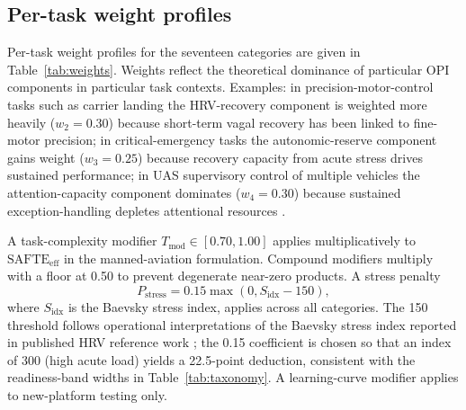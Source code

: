 \documentclass[10pt,journal,twocolumn,compsoc]{IEEEtran}
\begin{document}
\subsection{Per-task weight profiles}
Per-task weight profiles for the seventeen categories are given in Table~\ref{tab:weights}. Weights reflect the theoretical dominance of particular OPI components in particular task contexts. Examples: in precision-motor-control tasks such as carrier landing the HRV-recovery component is weighted more heavily ($w_2 = 0.30$) because short-term vagal recovery has been linked to fine-motor precision; in critical-emergency tasks the autonomic-reserve component gains weight ($w_3 = 0.25$) because recovery capacity from acute stress drives sustained performance; in UAS supervisory control of multiple vehicles the attention-capacity component dominates ($w_4 = 0.30$) because sustained exception-handling depletes attentional resources \cite{warm2008}.

A task-complexity modifier $T_{\mathrm{mod}} \in [0.70, 1.00]$ applies multiplicatively to $\mathrm{SAFTE_{eff}}$ in the manned-aviation formulation. Compound modifiers multiply with a floor at 0.50 to prevent degenerate near-zero products. A stress penalty
\begin{equation}
P_{\mathrm{stress}} = 0.15 \max(0, S_{\mathrm{idx}} - 150),
\label{eq:pstress}
\end{equation}
where $S_{\mathrm{idx}}$ is the Baevsky stress index, applies across all categories. The 150 threshold follows operational interpretations of the Baevsky stress index reported in published HRV reference work \cite{shaffer2017}; the 0.15 coefficient is chosen so that an index of 300 (high acute load) yields a 22.5-point deduction, consistent with the readiness-band widths in Table~\ref{tab:taxonomy}. A learning-curve modifier applies to new-platform testing only.
\end{document}
